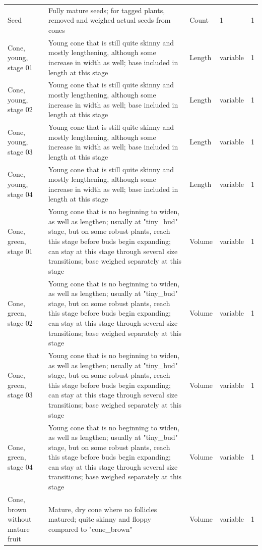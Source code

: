 \documentclass[10pt,twoside]{article}\usepackage[]{graphicx}\usepackage[]{color}
\begin{document}
\begin{longtable}{p{4.5cm}p{6cm}p{2cm}p{1cm}p{1cm}}
  Seed & Fully mature seeds; for tagged plants, removed and weighed actual seeds from cones & Count & 1 &   1 \\ 
  Cone, young, stage 01 & Young cone that is still quite skinny and mostly lengthening, although some increase in width as well; base included in length at this stage & Length & variable &   1 \\ 
  Cone, young, stage 02 & Young cone that is still quite skinny and mostly lengthening, although some increase in width as well; base included in length at this stage & Length & variable &   1 \\ 
  Cone, young, stage 03 & Young cone that is still quite skinny and mostly lengthening, although some increase in width as well; base included in length at this stage & Length & variable &   1 \\ 
  Cone, young, stage 04 & Young cone that is still quite skinny and mostly lengthening, although some increase in width as well; base included in length at this stage & Length & variable &   1 \\ 
  Cone, green, stage 01 & Young cone that is no beginning to widen, as well as lengthen; usually at "tiny\_bud" stage, but on some robust plants, reach this stage before buds begin expanding; can stay at this stage through several size transitions; base weighed separately at this stage & Volume & variable &   1 \\ 
  Cone, green, stage 02 & Young cone that is no beginning to widen, as well as lengthen; usually at "tiny\_bud" stage, but on some robust plants, reach this stage before buds begin expanding; can stay at this stage through several size transitions; base weighed separately at this stage & Volume & variable &   1 \\ 
  Cone, green, stage 03 & Young cone that is no beginning to widen, as well as lengthen; usually at "tiny\_bud" stage, but on some robust plants, reach this stage before buds begin expanding; can stay at this stage through several size transitions; base weighed separately at this stage & Volume & variable &   1 \\ 
  Cone, green, stage 04 & Young cone that is no beginning to widen, as well as lengthen; usually at "tiny\_bud" stage, but on some robust plants, reach this stage before buds begin expanding; can stay at this stage through several size transitions; base weighed separately at this stage & Volume & variable &   1 \\ 
  Cone, brown without mature fruit & Mature, dry cone where no follicles matured; quite skinny and floppy compared to "cone\_brown" & Volume & variable &   1 \\ 

\end{longtable}
\end{document}
